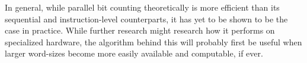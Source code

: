 In general, while parallel bit counting theoretically is more efficient than its sequential and instruction-level counterparts, it has yet to be shown to be the case in practice. While further research might research how it performs on specialized hardware, the algorithm behind this will probably first be useful when larger word-sizes become more easily available and computable, if ever.
